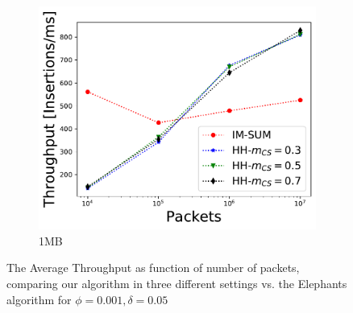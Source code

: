 \begin{figure}
\begin{subfigure}[t]{0.32\textwidth}
    \includegraphics[width=\linewidth]{HH/figures/throughput_per_pkts_m=1.0.pdf}
    \caption{1MB}
    \label{fig:fig4_f}
\end{subfigure}

\caption{The Average Throughput as function of number of packets, comparing our algorithm in three different settings vs. the Elephants algorithm for $\phi=0.001,\delta=0.05$}
\label{figure4}
\end{figure}